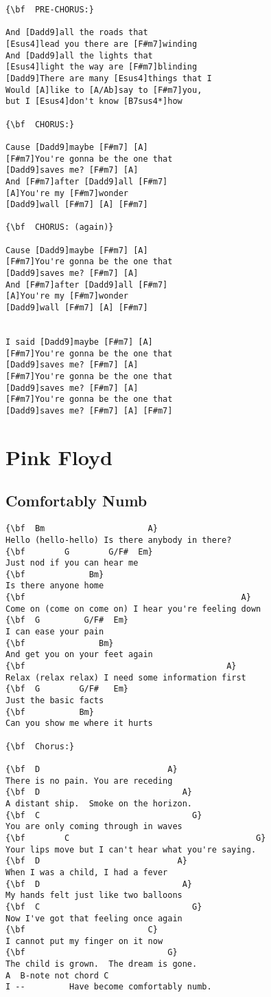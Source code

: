 \documentclass[a4paper]{article}
\begin{document}
\begin{Verbatim}[commandchars=\\\{\}]
{\bf  PRE-CHORUS:}

And [Dadd9]all the roads that 
[Esus4]lead you there are [F#m7]winding
And [Dadd9]all the lights that 
[Esus4]light the way are [F#m7]blinding
[Dadd9]There are many [Esus4]things that I 
Would [A]like to [A/Ab]say to [F#m7]you, 
but I [Esus4]don't know [B7sus4*]how

{\bf  CHORUS:}

Cause [Dadd9]maybe [F#m7] [A]
[F#m7]You're gonna be the one that 
[Dadd9]saves me? [F#m7] [A]
And [F#m7]after [Dadd9]all [F#m7]
[A]You're my [F#m7]wonder
[Dadd9]wall [F#m7] [A] [F#m7] 

{\bf  CHORUS: (again)}

Cause [Dadd9]maybe [F#m7] [A]
[F#m7]You're gonna be the one that 
[Dadd9]saves me? [F#m7] [A]
And [F#m7]after [Dadd9]all [F#m7]
[A]You're my [F#m7]wonder
[Dadd9]wall [F#m7] [A] [F#m7] 


I said [Dadd9]maybe [F#m7] [A]
[F#m7]You're gonna be the one that 
[Dadd9]saves me? [F#m7] [A]
[F#m7]You're gonna be the one that 
[Dadd9]saves me? [F#m7] [A]
[F#m7]You're gonna be the one that 
[Dadd9]saves me? [F#m7] [A] [F#m7]

\end{Verbatim}
\newpage
\section{Pink Floyd}
\subsection{Comfortably Numb}
\begin{Verbatim}[commandchars=\\\{\}]
{\bf  Bm				     A}
Hello (hello-hello) Is there anybody in there?
{\bf        G        G/F#  Em}
Just nod if you can hear me
{\bf             Bm}
Is there anyone home
{\bf                                            A}
Come on (come on come on) I hear you're feeling down
{\bf  G         G/F#  Em}
I can ease your pain
{\bf               Bm}
And get you on your feet again
{\bf                                         A}
Relax (relax relax) I need some information first
{\bf  G        G/F#   Em}
Just the basic facts
{\bf           Bm}
Can you show me where it hurts

{\bf  Chorus:}

{\bf  D                          A}
There is no pain. You are receding
{\bf  D                             A}
A distant ship.  Smoke on the horizon.
{\bf  C                               G}
You are only coming through in waves
{\bf        C                                      G}
Your lips move but I can't hear what you're saying.
{\bf  D                            A}
When I was a child, I had a fever
{\bf  D                             A}
My hands felt just like two balloons
{\bf  C                               G}
Now I've got that feeling once again
{\bf                         C}
I cannot put my finger on it now
{\bf                             G}
The child is grown.  The dream is gone.
A  B-note not chord C
I --         Have become comfortably numb.

\end{Verbatim}
\newpage
\end{document}
